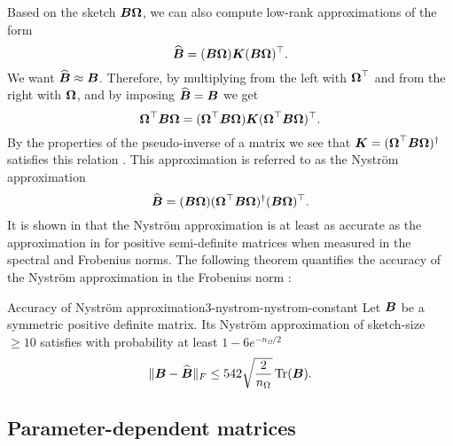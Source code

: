 Based on the sketch $\boldsymbol{B}\boldsymbol{\Omega}$, we can also compute low-rank approximations
of the form
\begin{equation}
    \widehat{\boldsymbol{B}} = (\boldsymbol{B} \boldsymbol{\Omega}) \boldsymbol{K} (\boldsymbol{B} \boldsymbol{\Omega})^{\top}.
    \label{equ:3-nystrom-nystrom-general}
\end{equation}
We want $\widehat{\boldsymbol{B}} \approx \boldsymbol{B}$. Therefore, by multiplying 
from the left with $\boldsymbol{\Omega}^{\top}$ and from the right with $\boldsymbol{\Omega}$,
and by imposing $\widehat{\boldsymbol{B}} = \boldsymbol{B}$ we get
\begin{equation}
    \boldsymbol{\Omega}^{\top} \boldsymbol{B} \boldsymbol{\Omega} = (\boldsymbol{\Omega}^{\top} \boldsymbol{B} \boldsymbol{\Omega}) \boldsymbol{K} (\boldsymbol{\Omega}^{\top} \boldsymbol{B} \boldsymbol{\Omega})^{\top}.
    \label{equ:3-nystrom-nystrom-unknown}
\end{equation}
By the properties of the pseudo-inverse of a matrix we see that
$\boldsymbol{K} = (\boldsymbol{\Omega}^{\top} \boldsymbol{B} \boldsymbol{\Omega})^{\dagger}$ satisfies this
relation \cite[section~3.1]{lin2017randomized}.
This approximation is referred to as the Nystr\"om approximation \cite{gittens2013nystrom,lin2017randomized}
\begin{equation}
    \widehat{\boldsymbol{B}} = (\boldsymbol{B} \boldsymbol{\Omega}) (\boldsymbol{\Omega}^{\top} \boldsymbol{B} \boldsymbol{\Omega})^{\dagger} (\boldsymbol{B} \boldsymbol{\Omega})^{\top}.
    \label{equ:3-nystrom-nystrom}
\end{equation}
It is shown in \cite[lemma~5.2]{tropp2023randomized} that the Nystr\"om approximation
is at least as accurate as the approximation in 
for positive semi-definite matrices when measured in the spectral
and Frobenius norms. The following theorem quantifies the accuracy of the
Nystr\"om approximation in the Frobenius norm \cite[lemma~3.2]{persson2022hutch}:

\begin{theorem}{Accuracy of Nystr\"om approximation}{3-nystrom-nystrom-constant}
    Let $\boldsymbol{B}$ be a symmetric positive definite matrix. Its Nystr\"om approximation
    of \gls{sketch-size} $\geq 10$ satisfies with probability at least $1-6e^{-n_{\Omega}/2}$
    \begin{equation}
        \lVert \boldsymbol{B} - \widehat{\boldsymbol{B}} \rVert _F \leq 542\sqrt{\frac{2}{n_{\Omega}}} \operatorname{Tr}(\boldsymbol{B}).
    \end{equation}
\end{theorem}

\subsection{Parameter-dependent matrices}
\label{subsec:3-nystrom-factorization-parameter-matrices}

